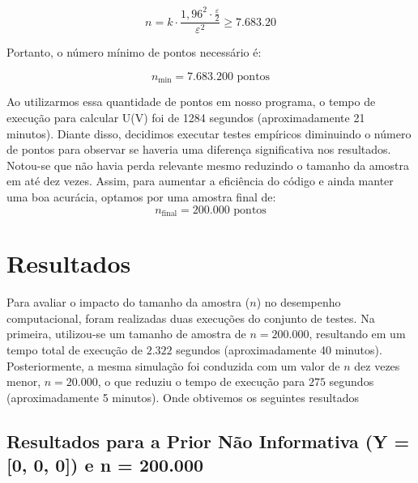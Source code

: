 \documentclass[12pt, a4paper]{article}
\begin{document}
\begin{equation*}
    n = k \cdot \frac{1{,}96^2 \cdot \frac{\varepsilon}{2}}{\varepsilon^2} \geq 7.683.20
\end{equation*}

Portanto, o número mínimo de pontos necessário é:

\[
n_{\text{min}} = 7.683.200 \text{ pontos}
\]

Ao utilizarmos essa quantidade de pontos em nosso programa, o tempo de execução para calcular U(V) foi de 1284 segundos (aproximadamente 21 minutos).
Diante disso, decidimos executar testes empíricos diminuindo o número de pontos para observar se haveria uma diferença significativa nos resultados. Notou-se que não havia perda relevante mesmo reduzindo o tamanho da amostra em até dez vezes. Assim, para aumentar a eficiência do código e ainda manter uma boa acurácia, optamos por uma amostra final de:
\[
n_{\text{final}} = 200.000 \text{ pontos}
\]


\section{Resultados}

Para avaliar o impacto do tamanho da amostra ($n$) no desempenho computacional, foram realizadas duas execuções do conjunto de testes. Na primeira, utilizou-se um tamanho de amostra de $n = 200.000$, resultando em um tempo total de execução de $2.322$ segundos (aproximadamente 40 minutos). Posteriormente, a mesma simulação foi conduzida com um valor de $n$ dez vezes menor, $n = 20.000$, o que reduziu o tempo de execução para $275$ segundos (aproximadamente 5 minutos). Onde obtivemos os seguintes resultados

\subsection{Resultados para a Prior Não Informativa (Y = [0, 0, 0]) e n = 200.000 }
\end{document}
